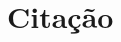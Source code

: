 \documentclass[aspectratio=169,english]{beamer}
\begin{document}
\section{Citação}


     
\end{document}
